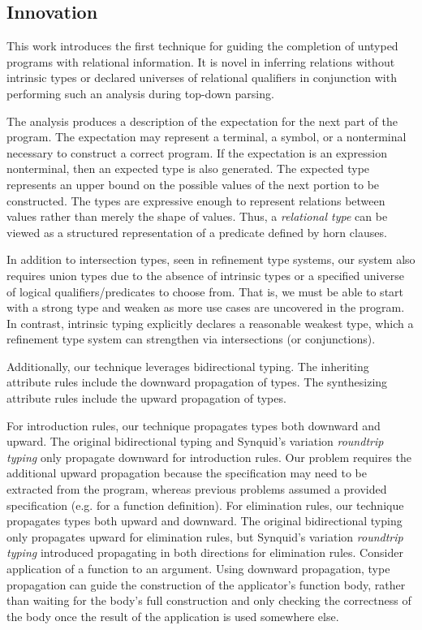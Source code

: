 \documentclass[sigplan,screen,review]{acmart}
\begin{document}
\subsection{Innovation}
This work introduces the first technique for guiding the completion of untyped programs with relational information. 
It is novel in inferring relations without intrinsic types or declared universes of relational qualifiers 
in conjunction with performing such an analysis during top-down parsing.

The analysis produces a description of the expectation for the next part of the program.
The expectation may represent a terminal, a symbol, or 
a nonterminal necessary to construct a correct program. If the expectation is an expression 
nonterminal, then an expected type is also generated. The expected type represents an upper bound
on the possible values of the next portion to be constructed. The types are expressive enough to represent relations 
between values rather than merely the shape of values. Thus, a \textit{relational type} can be viewed 
as a structured representation of a predicate defined by horn clauses. 

In addition to intersection types, seen in refinement type systems, our system also requires union types
due to the absence of intrinsic types or a specified universe of logical qualifiers/predicates to choose from. 
That is, we must be able to start with a strong type and weaken as more use cases are uncovered in the program. 
In contrast, intrinsic typing explicitly declares a reasonable weakest type, which a refinement type system  
can strengthen via intersections (or conjunctions).

Additionally, our technique leverages bidirectional typing.
The inheriting attribute rules include the downward propagation of types. 
The synthesizing attribute rules include the upward propagation of types. 

For introduction rules, our technique propagates types both downward and upward.
The original bidirectional typing and Synquid's variation \textit{roundtrip typing} only propagate downward for introduction rules. 
Our problem requires the additional upward propagation because the specification may need to be extracted from the program,
whereas previous problems assumed a provided specification (e.g. for a function definition).
For elimination rules, our technique propagates types both upward and downward.
The original bidirectional typing only propagates upward for elimination rules, but Synquid's variation \textit{roundtrip typing} 
introduced propagating in both directions for elimination rules.
Consider application of a function to an argument. Using downward propagation, 
type propagation can guide the construction of the applicator's function body,
rather than waiting for the body's full construction and only checking the correctness of the body 
once the result of the application is used somewhere else. 
\end{document}
